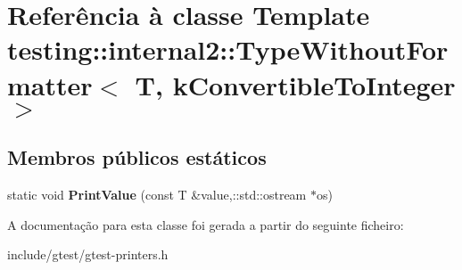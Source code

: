\hypertarget{classtesting_1_1internal2_1_1TypeWithoutFormatter_3_01T_00_01kConvertibleToInteger_01_4}{\section{Referência à classe Template testing\-:\-:internal2\-:\-:Type\-Without\-Formatter$<$ T, k\-Convertible\-To\-Integer $>$}
\label{classtesting_1_1internal2_1_1TypeWithoutFormatter_3_01T_00_01kConvertibleToInteger_01_4}
}
\subsection*{Membros públicos estáticos}
\begin{DoxyCompactItemize}
\item 
\hypertarget{classtesting_1_1internal2_1_1TypeWithoutFormatter_3_01T_00_01kConvertibleToInteger_01_4_a6b293e13b58e50bba0e220c25e0614b7}{static void {\bfseries Print\-Value} (const T \&value,\-::std\-::ostream $\ast$os)}\label{classtesting_1_1internal2_1_1TypeWithoutFormatter_3_01T_00_01kConvertibleToInteger_01_4_a6b293e13b58e50bba0e220c25e0614b7}

\end{DoxyCompactItemize}


A documentação para esta classe foi gerada a partir do seguinte ficheiro\-:\begin{DoxyCompactItemize}
\item 
include/gtest/gtest-\/printers.\-h\end{DoxyCompactItemize}
